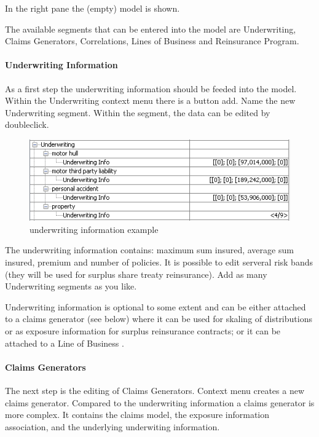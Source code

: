 In the right pane the (empty) model is shown.

The available segments that can be entered into the model are Underwriting, Claims Generators, Correlations, Lines of Business and Reinsurance Program.

\paragraph{Underwriting Information}
As a first step the underwriting information should be feeded into the model. Within the
Underwriting context menu there is a button add. Name the new Underwriting segment. Within
the segment, the data can be edited by doubleclick.
\begin{figure}
	\centering
		\includegraphics[scale=0.75]{images/podra-uwinfo.png}
	\caption{\PODRA{} underwriting information example}
	\label{fig:podra-uwinfo}
\end{figure}

The underwriting information contains: maximum sum insured, average sum insured, premium
and number of policies. It is possible to edit serveral risk bands (they will be used for
surplus share treaty reinsurance). Add as many Underwriting segments as you like.

Underwriting information is optional to some extent and can be either attached to a claims generator (see below) where it can be used for skaling of distributions or as exposure information for surplus reinsurance contracts; or it can be attached to a Line of Business .

\paragraph{Claims Generators}
The next step is the editing of Claims Generators. Context menu  creates a new claims
generator. Compared to the underwriting information a claims generator is more complex. It contains the claims model, the
exposure information association, and the underlying underwiting information.

